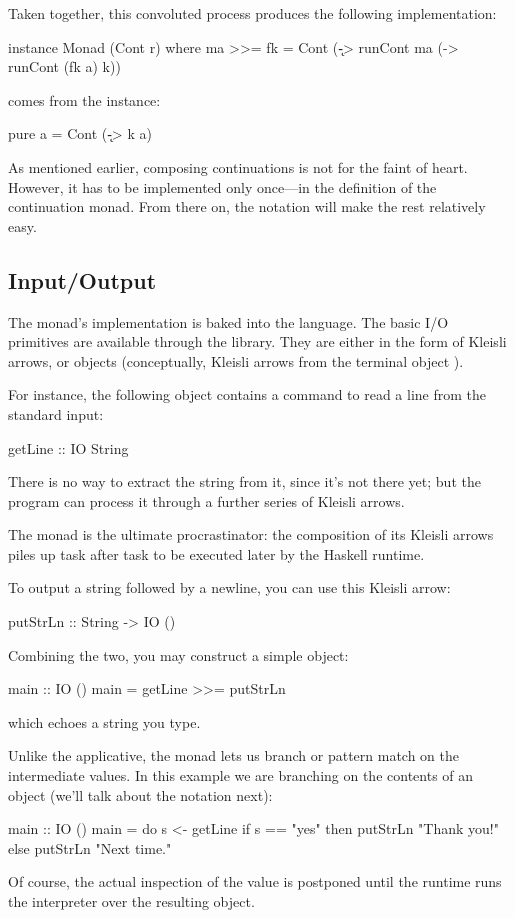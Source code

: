 \documentclass[DaoFP]{subfiles}
\begin{document}
Taken together, this convoluted process produces the following implementation:
\begin{haskell}
instance Monad (Cont r) where
  ma >>= fk = Cont (\k -> runCont ma (\a -> runCont (fk a) k))
\end{haskell}
 comes from the  instance:
\begin{haskell}
  pure a = Cont (\k -> k a)
\end{haskell}
As mentioned earlier, composing continuations is not for the faint of heart. However, it has to be implemented only once---in the definition of the continuation monad. From there on, the  notation will make the rest relatively easy.

\subsection{Input/Output}

The  monad's implementation is baked into the language. The basic I/O primitives are available through the library. They are either in the form of Kleisli arrows, or  objects (conceptually, Kleisli arrows from the terminal object \hask{()}). 

For instance, the following object contains a command to read a line from the standard input:
\begin{haskell}
getLine :: IO String
\end{haskell}
There is no way to extract the string from it, since it's not there yet; but the program can process it through a further series of Kleisli arrows. 

The  monad is the ultimate procrastinator: the composition of its Kleisli arrows piles up task after task to be executed later by the Haskell runtime.

To output a string followed by a newline, you can use this Kleisli arrow:
\begin{haskell}
putStrLn :: String -> IO ()
\end{haskell}
Combining the two, you may construct a simple  object:
\begin{haskell}
main :: IO ()
main = getLine >>= putStrLn
\end{haskell}
which echoes a string you type.

Unlike the applicative, the monad lets us branch or pattern match on the intermediate values. In this example we are branching on the contents of an  object (we'll talk about the  notation next):
\begin{haskell}
main :: IO ()
main = do
  s <- getLine
  if s == "yes"
  then putStrLn "Thank you!"
  else putStrLn "Next time."
\end{haskell}
Of course, the actual inspection of the value is postponed until the runtime runs the interpreter over the resulting  object. 
\end{document}
